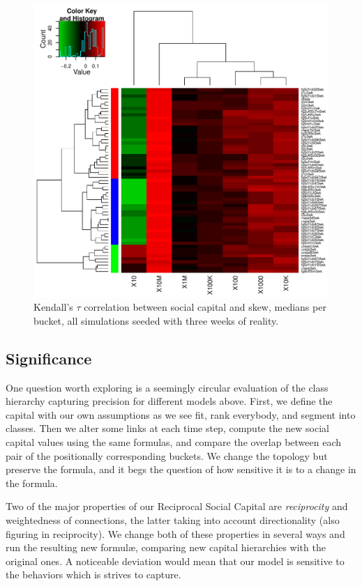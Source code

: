 \documentclass[10pt,oneside]{memoir}
\begin{document}
\begin{Spacing}{2}
\begin{figure}
\begin{center}
    \includegraphics{figures/crop/heatmap-cstaubs-medians-3wk}
    \caption{Kendall’s $\tau$ correlation between social capital and skew, medians per bucket, all simulations seeded with three weeks of reality.}
    \label{figure:heatmap-cstaubs-3wk}
\end{center}
\end{figure}
\pagebreak \subsection{Significance}
\label{significance}

One question worth exploring is a seemingly circular evaluation of the class hierarchy capturing precision for different models above.  First, we define the capital with our own assumptions as we see fit, rank everybody, and segment into classes.  Then we alter some links at each time step, compute the new social capital values using the same formulas, and compare the overlap between each pair of the positionally corresponding buckets.  We change the topology but preserve the formula, and it begs the question of how sensitive it is to a change in the formula.


Two of the major properties of our Reciprocal Social Capital are {\itshape reciprocity} and weightedness of connections, the latter taking into account directionality (also figuring in reciprocity).  We change both of these properties in several ways and run the resulting new formulæ, comparing new capital hierarchies with the original ones.  A noticeable deviation would mean that our model is sensitive to the behaviors which is strives to capture.



\end{Spacing}
\end{document}
